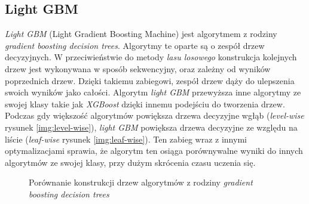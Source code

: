 \documentclass[a4paper, twoside, 11pt, openright]{article}
\begin{document}
\subsection{Light GBM}

\textit{Light GBM} (Light Gradient Boosting Machine)\cite{lgbm} jest algorytmem z rodziny \textit{gradient boosting decision trees}. Algorytmy te oparte są o zespół drzew decyzyjnych. W przeciwieństwie do metody \textit{lasu losowego} konstrukcja kolejnych drzew jest wykonywana w sposób sekwencyjny, oraz zależny od wyników poprzednich drzew. Dzięki takiemu zabiegowi, zespół drzew dąży do ulepszenia swoich wyników jako całości. Algorytm \textit{light GBM} przewyższa inne algorytmy ze swojej klasy takie jak \textit{XGBoost} dzięki innemu podejściu do tworzenia drzew. Podczas gdy większość algorytmów powiększa drzewa decyzyjne wgłąb (\textit{level-wise}  rysunek \ref{img:level-wise}), \textit{light GBM} powiększa drzewa decyzyjne ze względu na liście (\textit{leaf-wise} rysunek \ref{img:leaf-wise}). Ten zabieg wraz z innymi optymalizacjami sprawia, że algorytm ten osiąga porównywalne wyniki do innych algorytmów ze swojej klasy, przy dużym skrócenia czasu uczenia się. 


\begin{figure}[H]%
\centering
{}%
\qquad
{}%
\caption{Porównanie konstrukcji drzew algorytmów z rodziny \textit{gradient boosting decision trees}}
\label{img:level-leaf-wise}
\end{figure}
\end{document}
